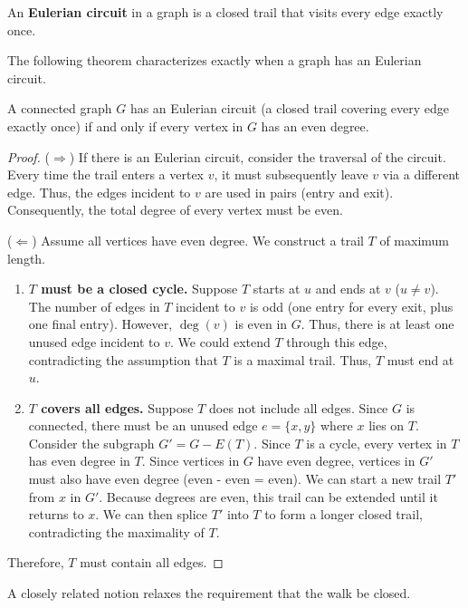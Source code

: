 \begin{definition}
An \textbf{Eulerian circuit} in a graph is a closed trail that visits every edge exactly once.
\end{definition}

The following theorem characterizes exactly when a graph has an Eulerian circuit.

\begin{theorem}
A connected graph $G$ has an Eulerian circuit (a closed trail covering every edge exactly once) if and only if every vertex in $G$ has an even degree.
\end{theorem}

\begin{proof}
($\Rightarrow$) If there is an Eulerian circuit, consider the traversal of the circuit. Every time the trail enters a vertex $v$, it must subsequently leave $v$ via a different edge. Thus, the edges incident to $v$ are used in pairs (entry and exit). Consequently, the total degree of every vertex must be even.

($\Leftarrow$) Assume all vertices have even degree. We construct a trail $T$ of maximum length.
\begin{enumerate}
    \item \textbf{$T$ must be a closed cycle.} Suppose $T$ starts at $u$ and ends at $v$ ($u \neq v$). The number of edges in $T$ incident to $v$ is odd (one entry for every exit, plus one final entry). However, $\deg(v)$ is even in $G$. Thus, there is at least one unused edge incident to $v$. We could extend $T$ through this edge, contradicting the assumption that $T$ is a maximal trail. Thus, $T$ must end at $u$.
    \item \textbf{$T$ covers all edges.} Suppose $T$ does not include all edges. Since $G$ is connected, there must be an unused edge $e=\{x, y\}$ where $x$ lies on $T$. Consider the subgraph $G' = G - E(T)$. Since $T$ is a cycle, every vertex in $T$ has even degree in $T$. Since vertices in $G$ have even degree, vertices in $G'$ must also have even degree (even - even = even).
    We can start a new trail $T'$ from $x$ in $G'$. Because degrees are even, this trail can be extended until it returns to $x$. We can then splice $T'$ into $T$ to form a longer closed trail, contradicting the maximality of $T$.
\end{enumerate}
Therefore, $T$ must contain all edges.
\end{proof}

A closely related notion relaxes the requirement that the walk be closed.

